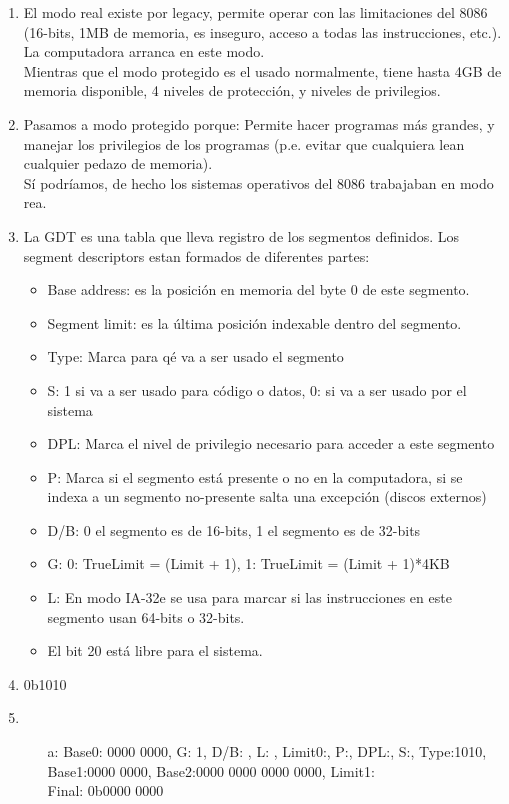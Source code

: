 \begin{enumerate}
\item El modo real existe por legacy, permite operar con las limitaciones del 8086 (16-bits, 1MB de memoria, es inseguro, acceso a todas las instrucciones, etc.). La computadora arranca en este modo. \\
  Mientras que el modo protegido es el usado normalmente, tiene hasta 4GB de memoria disponible, 4 niveles de protección, y niveles de privilegios.
\item Pasamos a modo protegido porque: Permite hacer programas más grandes, y manejar los privilegios de los programas (p.e. evitar que cualquiera lean cualquier pedazo de memoria). \\
  Sí podríamos, de hecho los sistemas operativos del 8086 trabajaban en modo rea.
\item La GDT es una tabla que lleva registro de los segmentos definidos. Los segment descriptors estan formados de diferentes partes: \begin{itemize}
  \item Base address: es la posición en memoria del byte 0 de este segmento.
  \item Segment limit: es la última posición indexable dentro del segmento.
  \item Type: Marca para qé va a ser usado el segmento %
  \item S: 1 si va a ser usado para código o datos, 0: si va a ser usado por el sistema
  \item DPL: Marca el nivel de privilegio necesario para acceder a este segmento
  \item P: Marca si el segmento está presente o no en la computadora, si se indexa a un segmento no-presente salta una excepción (discos externos)
  \item D/B: 0 el segmento es de 16-bits, 1 el segmento es de 32-bits %
  \item G: 0: TrueLimit = (Limit + 1), 1: TrueLimit = (Limit + 1)*4KB
  \item L: En modo IA-32e se usa para marcar si las instrucciones en este segmento usan 64-bits o 32-bits.
  \item El bit 20 está libre para el sistema.
  \end{itemize}
\item 0b1010 %
\item \begin{itemize}
  \item[a:] Base0: 0000 0000, G: 1, D/B: , L: , Limit0:, P:, DPL:, S:, Type:1010, Base1:0000 0000, Base2:0000 0000 0000 0000, Limit1:\\
    Final: 0b0000 0000
  \end{itemize}
\end{enumerate}
